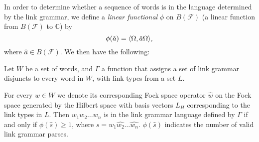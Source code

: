 \documentclass[12pt]{report}
\begin{document}
In order to determine whether a sequence of words is in the language determined by the link grammar, we define a \emph{linear functional} $\phi$ on $B(\mathcal{F})$ (a linear function from $B(\mathcal{F})$ to $\mathbb{C}$) by
$$\phi(\hat{a}) = \langle \Omega, \hat{a}\Omega \rangle,$$
where $\hat{a} \in B(\mathcal{F})$.  We then have the following:
\begin{prop}
Let $W$ be a set of words, and $\Gamma$ a function that assigns a set of link grammar disjuncts to every word in $W$, with link types from a set $L$.

For every $w \in W$ we denote its corresponding Fock space operator $\hat{w}$ on the Fock space generated by the Hilbert space with basis vectors $L_H$  corresponding to the link types in $L$. Then $w_1w_2\ldots w_n$ is in the link grammar language defined by $\Gamma$ if and only if $\phi(\hat{s}) \ge 1$, where $s = \hat{w_1}\hat{w_2}\ldots\hat{w_n}$. $\phi(\hat{s})$ indicates the number of valid link grammar parses.
\end{prop}
\end{document}

